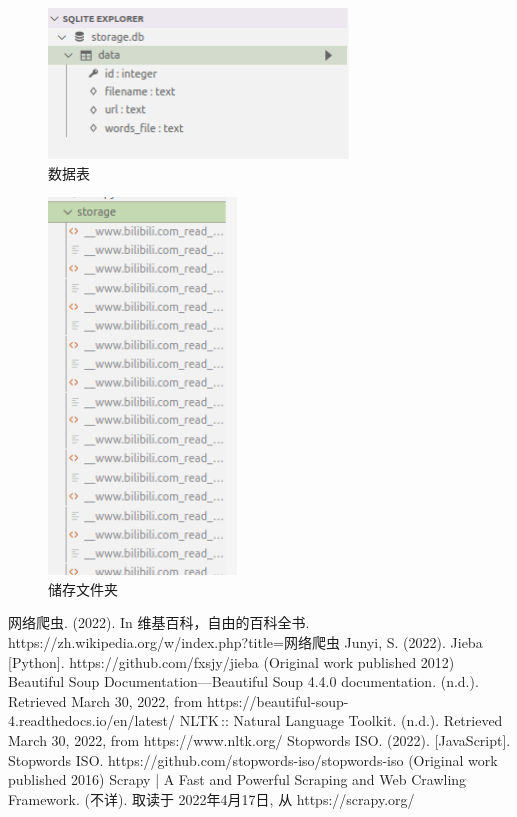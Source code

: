 \documentclass{article}
\begin{document}
\begin{CJK*}{UTF8}{gbsn}
\begin{figure}[H]
\centering
\includegraphics[height=4cm]{db_table.png}
\caption{数据表}
\end{figure}

\begin{figure}[H]
\centering
\includegraphics[height=10cm]{storage.png}
\caption{储存文件夹}
\end{figure}


\newpage
\begin{thebibliography}{}
网络爬虫. (2022). In 维基百科，自由的百科全书. https://zh.wikipedia.org/w/index.php?title=网络爬虫
Junyi, S. (2022). Jieba [Python]. https://github.com/fxsjy/jieba (Original work published 2012)
Beautiful Soup Documentation—Beautiful Soup 4.4.0 documentation. (n.d.). Retrieved March 30, 2022, from https://beautiful-soup-4.readthedocs.io/en/latest/
NLTK :: Natural Language Toolkit. (n.d.). Retrieved March 30, 2022, from https://www.nltk.org/
Stopwords ISO. (2022). [JavaScript]. Stopwords ISO. https://github.com/stopwords-iso/stopwords-iso (Original work published 2016)
Scrapy | A Fast and Powerful Scraping and Web Crawling Framework. (不详). 取读于 2022年4月17日, 从 https://scrapy.org/



\end{thebibliography}

\end{CJK*}
\end{document}
